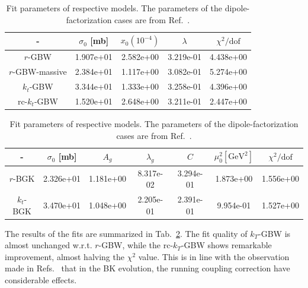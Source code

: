 \documentclass[11pt]{article}
\begin{document}
\begin{table}[t]
\begin{subtable}{\textwidth}
\center\footnotesize
\begin{tabular}{|c|c|c|c|c|}
	\hline - & $\sigma_0 $ [mb] & $x_0 \left(10^{-4}\right)$ & $\lambda$ & $\chi^2/\mathrm{dof}$ \\\hline 
	{\footnotesize $r$-GBW} & 1.907e+01& 2.582e+00& 3.219e-01& 4.438e+00\\\hline 
	{\footnotesize $r$-GBW-massive} & 2.384e+01& 1.117e+00& 3.082e-01& 5.274e+00\\\hline 
	{\footnotesize $k_t$-GBW} & 3.344e+01& 1.333e+00& 3.258e-01& 4.396e+00\\\hline 
	{\footnotesize rc-$k_t$-GBW} & 1.520e+01& 2.648e+00& 3.211e-01& 2.447e+00\\\hline 
\end{tabular}
\vspace{2mm}
\end{subtable}
\begin{subtable}{\textwidth}
\center\footnotesize
\begin{tabular}{|c|c|c|c|c|c|c|}
	\hline - & $\sigma_0 $ [mb] & $A_g$ & $\lambda_g$ & $C$ & $\mu_0^2 \left[\mathrm{GeV^2}\right]$ & $\chi^2/\mathrm{dof}$ \\\hline 
	{\footnotesize $r$-BGK} & 2.326e+01& 1.181e+00& 8.317e-02& 3.294e-01& 1.873e+00& 1.556e+00\\\hline 
	{\footnotesize $k_t$-BGK} & 3.470e+01& 1.048e+00& 2.205e-01&2.391e-01& 9.954e-01&  1.527e+00\\\hline 
\end{tabular}
\vspace{2mm}
\end{subtable}
\caption{Fit parameters of respective models. The parameters of the
dipole-factorization cases are from Ref.~\cite{Goda:2022wsc}.}
\label{tab:table}
\end{table}

The results of the fits are summarized in Tab.~\ref{tab:table}. 
The fit quality of $k_T$-GBW is almost unchanged w.r.t. $r$-GBW, while the rc-$k_T$-GBW shows remarkable improvement, almost halving the $\chi^2$ value.
This is in line with the observation made in Refs.~\cite{Albacete:2004gw,Albacete:2007yr,Albacete:2010sy} that in the BK evolution, the running coupling correction have considerable effects.
\end{document}
